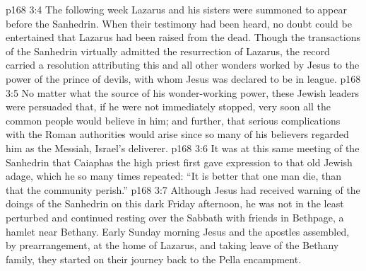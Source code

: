 \vs p168 3:4 The following week Lazarus and his sisters were summoned to appear before the Sanhedrin. When their testimony had been heard, no doubt could be entertained that Lazarus had been raised from the dead. Though the transactions of the Sanhedrin virtually admitted the resurrection of Lazarus, the record carried a resolution attributing this and all other wonders worked by Jesus to the power of the prince of devils, with whom Jesus was declared to be in league.
\vs p168 3:5 No matter what the source of his wonder\hyp{}working power, these Jewish leaders were persuaded that, if he were not immediately stopped, very soon all the common people would believe in him; and further, that serious complications with the Roman authorities would arise since so many of his believers regarded him as the Messiah, Israel’s deliverer.
\vs p168 3:6 It was at this same meeting of the Sanhedrin that Caiaphas the high priest first gave expression to that old Jewish adage, which he so many times repeated: “It is better that one man die, than that the community perish.”
\vs p168 3:7 Although Jesus had received warning of the doings of the Sanhedrin on this dark Friday afternoon, he was not in the least perturbed and continued resting over the Sabbath with friends in Bethpage, a hamlet near Bethany. Early Sunday morning Jesus and the apostles assembled, by prearrangement, at the home of Lazarus, and taking leave of the Bethany family, they started on their journey back to the Pella encampment.
